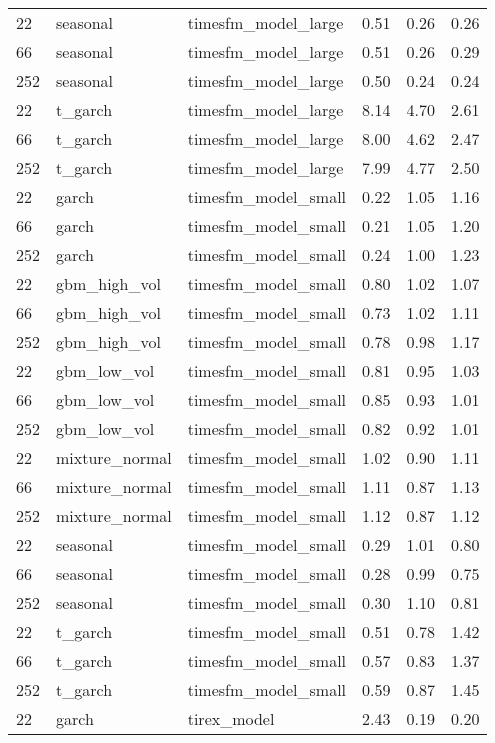 {\begin{tabular}{lllrrr}
\midrule
22 & seasonal & timesfm\_model\_large & 0.51 & 0.26 & 0.26 \\
66 & seasonal & timesfm\_model\_large & 0.51 & 0.26 & 0.29 \\
252 & seasonal & timesfm\_model\_large & 0.50 & 0.24 & 0.24 \\
\midrule
22 & t\_garch & timesfm\_model\_large & 8.14 & 4.70 & 2.61 \\
66 & t\_garch & timesfm\_model\_large & 8.00 & 4.62 & 2.47 \\
252 & t\_garch & timesfm\_model\_large & 7.99 & 4.77 & 2.50 \\
\midrule
22 & garch & timesfm\_model\_small & 0.22 & 1.05 & 1.16 \\
66 & garch & timesfm\_model\_small & 0.21 & 1.05 & 1.20 \\
252 & garch & timesfm\_model\_small & 0.24 & 1.00 & 1.23 \\
\midrule
22 & gbm\_high\_vol & timesfm\_model\_small & 0.80 & 1.02 & 1.07 \\
66 & gbm\_high\_vol & timesfm\_model\_small & 0.73 & 1.02 & 1.11 \\
252 & gbm\_high\_vol & timesfm\_model\_small & 0.78 & 0.98 & 1.17 \\
\midrule
22 & gbm\_low\_vol & timesfm\_model\_small & 0.81 & 0.95 & 1.03 \\
66 & gbm\_low\_vol & timesfm\_model\_small & 0.85 & 0.93 & 1.01 \\
252 & gbm\_low\_vol & timesfm\_model\_small & 0.82 & 0.92 & 1.01 \\
\midrule
22 & mixture\_normal & timesfm\_model\_small & 1.02 & 0.90 & 1.11 \\
66 & mixture\_normal & timesfm\_model\_small & 1.11 & 0.87 & 1.13 \\
252 & mixture\_normal & timesfm\_model\_small & 1.12 & 0.87 & 1.12 \\
\midrule
22 & seasonal & timesfm\_model\_small & 0.29 & 1.01 & 0.80 \\
66 & seasonal & timesfm\_model\_small & 0.28 & 0.99 & 0.75 \\
252 & seasonal & timesfm\_model\_small & 0.30 & 1.10 & 0.81 \\
\midrule
22 & t\_garch & timesfm\_model\_small & 0.51 & 0.78 & 1.42 \\
66 & t\_garch & timesfm\_model\_small & 0.57 & 0.83 & 1.37 \\
252 & t\_garch & timesfm\_model\_small & 0.59 & 0.87 & 1.45 \\
\midrule
22 & garch & tirex\_model & 2.43 & 0.19 & 0.20 \\

\end{tabular}}
